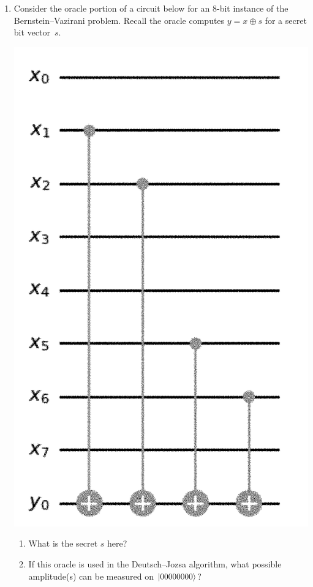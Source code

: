 \documentclass[12pt]{article}
\begin{document}
\begin{enumerate}[font=\bfseries]
    \item {} Consider the oracle portion of a circuit below for an $8$-bit instance of the Bernstein--Vazirani problem.  Recall the oracle computes $y=x\oplus s$ for a secret bit vector~$s$.
 \begin{center}   
    \includegraphics[scale=0.45]{ps250-assets/bv.png}
    \end{center}
\begin{enumerate}[label=\theenumi.\arabic*]
\item What is the secret $s$ here? \Blank[2in]{}
    \item If this oracle is used in the Deutsch--Jozsa algorithm, what possible amplitude(s) can be measured on $\ket{00000000}$?
    

\end{enumerate}
\end{enumerate}
\end{document}
